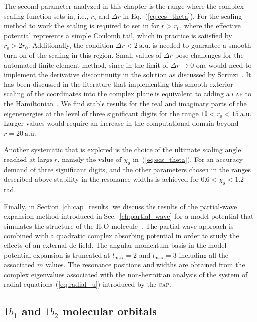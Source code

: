 The second parameter analyzed in this chapter is the range where the
complex scaling function sets in, i.e., $r_{\mathrm{s}}$ and $\Delta
r$ in Eq.~(\ref{eq:ecs_theta}). For the scaling method to work the
scaling is required to set in for $r > r_0$, where the effective
potential represents a simple Coulomb tail, which in practice is
satisfied by $r_{\mathrm{s}} > 2r_{0}$. Additionally, the condition
$\Delta r < 2\ \mathrm{a.u.}$ is needed to guarantee a smooth turn-on
of the scaling in this region. Small values of $\Delta r$ pose
challenges for the automated finite-element method, since in the limit
of $\Delta r \to 0$ one would need to implement the derivative
discontinuity in the solution as discussed by
Scrinzi~\cite{ecsScrinzi}. It has been discussed in the literature
that implementing this smooth exterior scaling of the coordinates into
the complex plane is equivalent to adding a \textsc{cap} to the
Hamiltonian~\cite{ECS_sim_CAP_1991,ECS_sim_CAP_1998}. We find stable
results for the real and imaginary parts of the eigenenergies at the
level of three significant digits for the range $10 < r_{\mathrm{s}} <
15\ \mathrm{a.u.}$ Larger values would require an increase in the
computational domain beyond $r = 20\ \mathrm{a.u.}$

Another systematic that is explored is the choice of the ultimate
scaling angle reached at large $r$, namely the value of
$\chi_{\mathrm{s}}$ in~(\ref{eq:ecs_theta}). For an accuracy demand of
three significant digits, and the other parameters chosen in the
ranges described above stability in the resonance widths is achieved
for $0.6< \chi_{\mathrm{s}} < 1.2$ rad.

Finally, in Section~\ref{ch:cap_results} we discuss the results of the
partial-wave expansion method introduced in Sec.~\ref{ch:partial_wave}
for a model potential that simulates the structure of the H$_{2}$O
molecule~\cite{illescas_modelV_2011}. The partial-wave approach is
combined with a quadratic complex absorbing potential in order to
study the effects of an external dc field. The angular momentum basis
in the model potential expansion is truncated at $l_{\mathrm{max}} =
2$ and $l_{\mathrm{max}} = 3$ including all the associated $m$
values. The resonance positions and widths are obtained from the
complex eigenvalues associated with the non-hermitian analysis of the
system of radial equations~(\ref{eq:radial_u}) introduced by the
\textsc{cap}.


\subsection{$1b_{1}$ and $1b_{2}$ molecular orbitals}
\label{ch:1b1_1b2_results}

